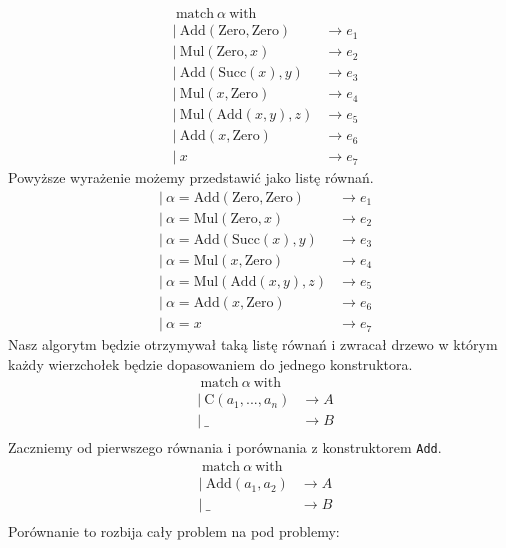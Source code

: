 \documentclass[a4paper,12pt]{book} %
\begin{document}
\begin{align*}
   & \ \text{match}\ \alpha\ \text{with}                       \\
   & |\ \text{Add}(\text{Zero}, \text{Zero}) & \rightarrow e_1 \\
   & |\ \text{Mul}(\text{Zero}, x)           & \rightarrow e_2 \\
   & |\ \text{Add}(\text{Succ}(x), y)        & \rightarrow e_3 \\
   & |\ \text{Mul}(x, \text{Zero})           & \rightarrow e_4 \\
   & |\ \text{Mul}(\text{Add}(x,y), z)       & \rightarrow e_5 \\
   & |\ \text{Add}(x,\text{Zero})            & \rightarrow e_6 \\
   & |\ x                                    & \rightarrow e_7
\end{align*}
Powyższe wyrażenie możemy przedstawić jako listę równań.
\begin{align*}
   & |\ \alpha = \text{Add}(\text{Zero}, \text{Zero}) & \rightarrow e_1 \\
   & |\ \alpha = \text{Mul}(\text{Zero}, x)           & \rightarrow e_2 \\
   & |\ \alpha = \text{Add}(\text{Succ}(x), y)        & \rightarrow e_3 \\
   & |\ \alpha = \text{Mul}(x, \text{Zero})           & \rightarrow e_4 \\
   & |\ \alpha = \text{Mul}(\text{Add}(x,y), z)       & \rightarrow e_5 \\
   & |\ \alpha = \text{Add}(x,\text{Zero})            & \rightarrow e_6 \\
   & |\ \alpha = x                                    & \rightarrow e_7
\end{align*}
Nasz algorytm będzie otrzymywał taką listę równań i zwracał drzewo w którym każdy wierzchołek będzie dopasowaniem do jednego konstruktora.
\begin{align*}
   & \ \text{match}\ \alpha\ \text{with}                 \\
   & |\  \text{C}(a_1,..., a_n)          & \rightarrow A \\
   & |\ \_                               & \rightarrow B \\
\end{align*}
Zaczniemy od pierwszego równania i porównania z konstruktorem \lstinline$Add$.
\begin{align*}
   & \ \text{match}\ \alpha\ \text{with}                 \\
   & |\  \text{Add}(a_1, a_2)            & \rightarrow A \\
   & |\ \_                               & \rightarrow B \\
\end{align*}
Porównanie to rozbija cały problem na pod problemy:
\end{document}
